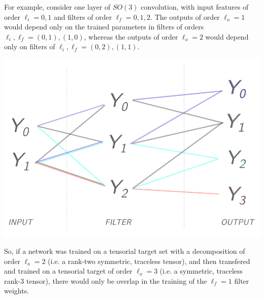 \documentclass[10pt,a4paper]{article}
\begin{document}
For example, consider one layer of $SO(3)$ convolution, with input features of order $\ell_i=0,1$ and filters of order $\ell_f = 0,1,2$. The outputs of order $\ell_{o}=1$ would depend only on the trained parameters in filters of orders $\ell_i,\ell_f = (0,1),(1,0)$, whereas the outputs of order $\ell_{o}=2$ would depend only on filters of $\ell_i,\ell_f = (0,2),(1,1)$. 
\begin{center}
\includegraphics[scale=0.5]{featurepath_ex_12.pdf}
\end{center}
So, if a network was trained on a tensorial target set with a decomposition of order $\ell_o=2$ (i.e. a rank-two symmetric, traceless tensor), and then transfered and trained on a tensorial target of order $\ell_o = 3$ (i.e. a symmetric, traceless rank-3 tensor), there would only be overlap in the training of the $\ell_f=1$ filter weights.
\end{document}
